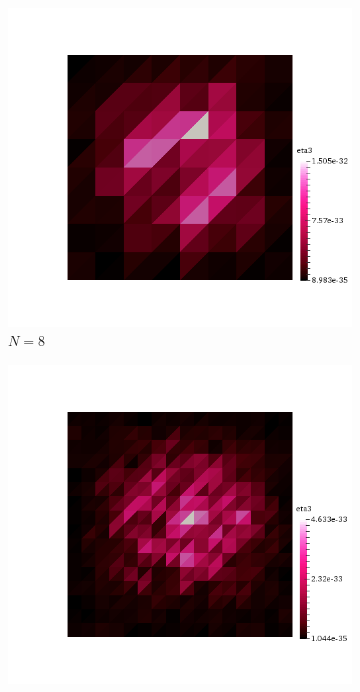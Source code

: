 \begin{figure}[h!]
  \centering
  \begin{subfigure}[b]{0.24\textwidth}
    \includegraphics[width=\textwidth,height=\textheight,keepaspectratio,height=\textheight,keepaspectratio]{figures/2_mpet/no_transfer/space/eta3_8.png}
    \caption{$N=8$}
  \end{subfigure}
  \begin{subfigure}[b]{0.24\textwidth}
    \includegraphics[width=\textwidth,height=\textheight,keepaspectratio,height=\textheight,keepaspectratio]{figures/2_mpet/no_transfer/space/eta3_16.png}

\end{subfigure}
\end{figure}
